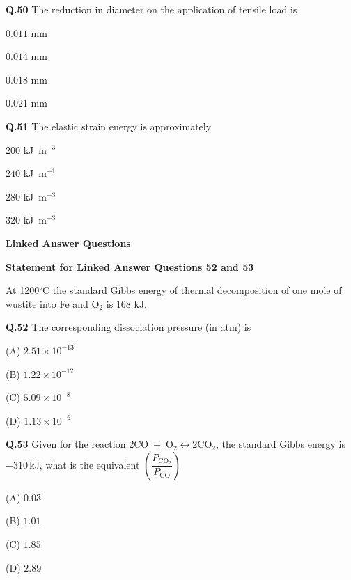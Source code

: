 \documentclass[journal,12pt,onecolumn]{IEEEtran}
\theoremstyle{remark}
\begin{document}
\begin{enumerate}
    \textbf{Q.50} The reduction in diameter on the application of tensile load is
    \hfill{}
    \begin{enumerate}[label=(\Alph*)]
    \begin{multicols}{4}
    \item $0.011$ mm
    \item $0.014$ mm
    \item $0.018$ mm
    \item $0.021$ mm
    \end{multicols}
    \end{enumerate}

    \textbf{Q.51} The elastic strain energy is approximately
    \hfill{}
    \begin{enumerate}[label=(\Alph*)]
    \begin{multicols}{4}
    \item $200$ kJ~m$^{-3}$
    \item $240$ kJ~m$^{-1}$
    \item $280$ kJ~m$^{-3}$
    \item $320$ kJ~m$^{-3}$
    \end{multicols}
    \end{enumerate}
    

    \textbf{Linked Answer Questions}

    \bigskip

    \textbf{Statement for Linked Answer Questions 52 and 53}

    At 1200$^\circ$C the standard Gibbs energy of thermal decomposition of one mole of wustite into Fe and O$_2$ is 168 kJ.

    \noindent\textbf{Q.52} The corresponding dissociation pressure (in atm) is
    \hfill{}
    \begin{enumerate}[label=(\Alph*)]
    \begin{multicols}{4}
    \item[(A)] $2.51 \times 10^{-13}$
    \item[(B)] $1.22 \times 10^{-12}$
    \item[(C)] $5.09 \times 10^{-8}$
    \item[(D)] $1.13 \times 10^{-6}$
    \end{multicols}
    \end{enumerate}

    \noindent\textbf{Q.53} Given for the reaction $2$CO~$+$~O$_2 \leftrightarrow 2$CO$_2$, the standard Gibbs energy is $-310$\,kJ, what is the equivalent $\left(\dfrac{P_{\mathrm{CO}_2}}{P_{\mathrm{CO}}}\right)$
    \hfill{}
    \begin{enumerate}[label=(\Alph*)]
    \begin{multicols}{4}
    \item[(A)] $0.03$
    \item[(B)] $1.01$
    \item[(C)] $1.85$
    \item[(D)] $2.89$
    \end{multicols}
    \end{enumerate}


\end{enumerate}
\end{document}
